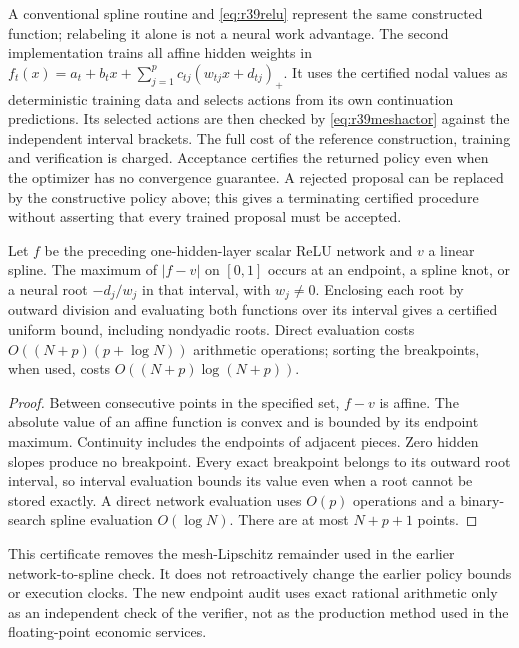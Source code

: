 A conventional spline routine and \eqref{eq:r39relu} represent the same
constructed function; relabeling it alone is not a neural work advantage.
The second implementation trains all affine hidden weights in
$f_t(x)=a_t+b_tx+\sum_{j=1}^p c_{tj}(w_{tj}x+d_{tj})_+$.
It uses the certified nodal values as deterministic training data and selects
actions from its own continuation predictions. Its selected actions are then
checked by \eqref{eq:r39meshactor} against the independent interval brackets.
The full cost of the reference construction, training and verification is
charged. Acceptance certifies the returned policy even when the optimizer has
no convergence guarantee. A rejected proposal can be replaced by the
constructive policy above; this gives a terminating certified procedure without
asserting that every trained proposal must be accepted.

\begin{proposition}
\label{prop:r39breakpoints}
Let $f$ be the preceding one-hidden-layer scalar ReLU network and $v$ a linear
spline. The maximum of $|f-v|$ on $[0,1]$ occurs at an endpoint, a spline knot,
or a neural root $-d_j/w_j$ in that interval, with $w_j\ne0$. Enclosing each
root by outward division and evaluating both functions over its interval gives
a certified uniform bound, including nondyadic roots. Direct evaluation costs
$O((N+p)(p+\log N))$ arithmetic operations; sorting the breakpoints, when used,
costs $O((N+p)\log(N+p))$.
\end{proposition}
\begin{proof}
Between consecutive points in the specified set, $f-v$ is affine. The absolute
value of an affine function is convex and is bounded by its endpoint maximum.
Continuity includes the endpoints of adjacent pieces. Zero hidden slopes
produce no breakpoint. Every exact breakpoint belongs to its outward root
interval, so interval evaluation bounds its value even when a root cannot be
stored exactly. A direct network evaluation uses $O(p)$ operations and a
binary-search spline evaluation $O(\log N)$. There are at most $N+p+1$ points.
\end{proof}

This certificate removes the mesh-Lipschitz remainder used in the earlier
network-to-spline check. It does not retroactively change the earlier policy
bounds or execution clocks. The new endpoint audit uses exact rational
arithmetic only as an independent check of the verifier, not as the production
method used in the floating-point economic services.

